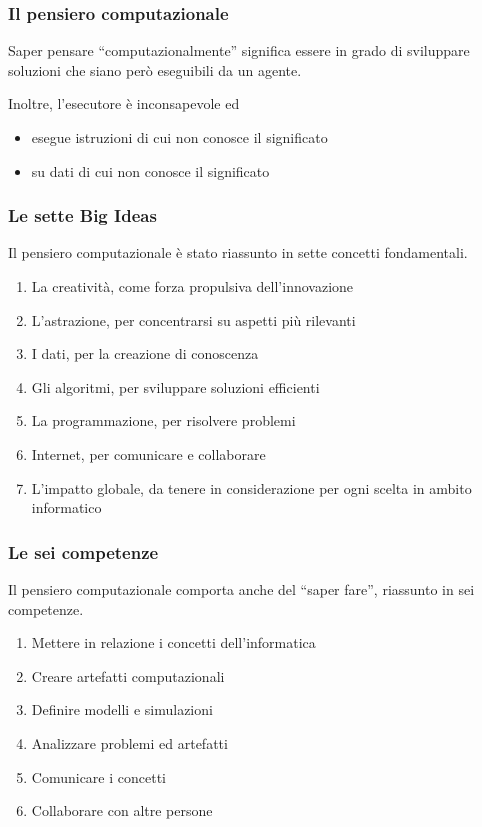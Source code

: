 \documentclass{beamer}
\begin{document}
\begin{frame}
  \frametitle{Il pensiero computazionale}

  Saper pensare ``computazionalmente'' significa essere in grado di sviluppare soluzioni che siano però eseguibili da un agente.
  
  \vspace{1em}

  Inoltre, l'esecutore è inconsapevole ed
  \begin{itemize}
    \item esegue istruzioni di cui non conosce il significato
    \item su dati di cui non conosce il significato
  \end{itemize}
\end{frame}

\begin{frame}
  \frametitle{Le sette Big Ideas}

  Il pensiero computazionale è stato riassunto in sette concetti fondamentali.
  
  \begin{enumerate}
    \item La creatività, come forza propulsiva dell'innovazione
    \item L'astrazione, per concentrarsi su aspetti più rilevanti
    \item I dati, per la creazione di conoscenza
    \item Gli algoritmi, per sviluppare soluzioni efficienti
    \item La programmazione, per risolvere problemi
    \item Internet, per comunicare e collaborare
    \item L'impatto globale, da tenere in considerazione per ogni scelta in ambito informatico
  \end{enumerate}
\end{frame}

\begin{frame}
  \frametitle{Le sei competenze}

  Il pensiero computazionale comporta anche del ``saper fare'', riassunto in sei competenze.
  
  \begin{enumerate}
    \item Mettere in relazione i concetti dell'informatica
    \item Creare artefatti computazionali
    \item Definire modelli e simulazioni
    \item Analizzare problemi ed artefatti
    \item Comunicare i concetti
    \item Collaborare con altre persone
  \end{enumerate}
\end{frame}
\end{document}
